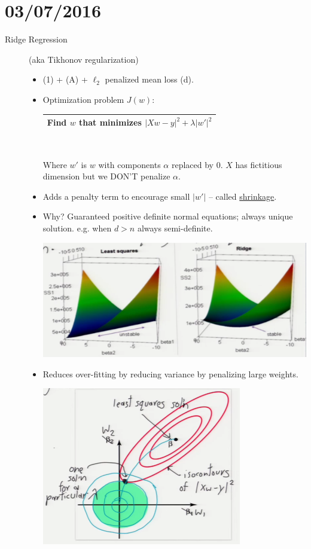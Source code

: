 \documentclass[10pt]{article}
\begin{document}
\section*{03/07/2016}
\begin{description}
	\item[Ridge Regression] (aka Tikhonov regularization)
	\
	\begin{itemize}
		\item (1) + (A) + $\ell_{2}$ penalized mean loss (d).
		\item Optimization problem $J(w)$:
		\begin{center}
			\begin{tabular}{|c|}
				\hline
				Find $w$ that minimizes
				$|Xw - y|^{2} + \lambda|w'|^{2}$\\
				\hline
			\end{tabular}\\
		\end{center}
		Where $w'$ is $w$ with components $\alpha$ replaced by 0. $X$ has fictitious dimension but we DON'T penalize $\alpha$.
		\item Adds a penalty term to encourage small $|w'|$ -- called \underline{shrinkage}.
		\item Why? Guaranteed positive definite normal equations; always unique solution. e.g. when $d>n$ always semi-definite.
			\begin{center}
				\includegraphics[scale=0.5]{images/ridge}
			\end{center}
		\item Reduces over-fitting by reducing variance by penalizing large weights.
			\begin{center}
				\includegraphics[scale=0.5]{images/sqrsvslambda}

\end{center}
\end{itemize}
\end{description}
\end{document}
